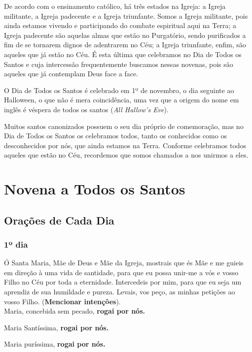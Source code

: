 \documentclass[a4paper,14pt]{extarticle} \usepackage[utf8]{inputenc}
\begin{document}
De acordo com o ensinamento católico, há três estados na Igreja: a Igreja militante, a Igreja padecente e a Igreja triunfante. Somos a Igreja militante, pois ainda estamos vivendo e participando do combate espiritual aqui na Terra; a Igreja padecente são aquelas almas que estão no Purgatório, sendo purificados a fim de se tornarem dignos de adentrarem no Céu; a Igreja triunfante, enfim, são aqueles que já estão no Céu. É esta última que celebramos no Dia de Todos os Santos e cuja intercessão frequentemente buscamos nessas novenas, pois são aqueles que já contemplam Deus face a face.

O Dia de Todos os Santos é celebrado em 1º de novembro, o dia seguinte ao Halloween, o que não é mera coincidência, uma vez que a origem do nome em inglês é véspera de todos os santos (\textit{All Hallow’s Eve}).

Muitos santos canonizados possuem o seu dia próprio de comemoração, mas no Dia de Todos os Santos os celebramos todos, tanto os conhecidos como os desconhecidos por nós, que ainda estamos na Terra. Conforme celebramos todos aqueles que estão no Céu, recordemos que somos chamados a nos unirmos a eles.

\newpage

\section{Novena a Todos os Santos}

\subsection{Orações de Cada Dia}
\subsubsection{1º dia}

Ó Santa Maria, Mãe de Deus e Mãe da Igreja, mostrais que és Mãe e me guieis em direção à uma vida de santidade, para que eu possa unir-me a vós e vosso Filho no Céu por toda a eternidade. 
Intercedeis por mim, para que eu seja um aprendiz de sua humildade e pureza. Levais, vos peço, as minhas petições ao vosso Filho. (\textbf{Mencionar intenções}).\\

Maria, concebida sem pecado, \textbf{rogai por nós.}

Maria Santíssima, \textbf{rogai por nós.}

Maria puríssima, \textbf{rogai por nós.}
\end{document}

